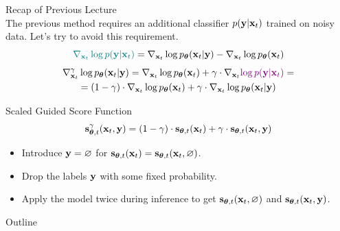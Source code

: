 \documentclass{beamer}
\begin{document}
\begin{frame}{Recap of Previous Lecture}
	\\ The previous method requires an additional classifier $p(\mathbf{y} | \mathbf{x}_t)$ trained on noisy data. Let's try to avoid this requirement.
	\[
		{\color{teal}\nabla_{\mathbf{x}_t} \log p(\mathbf{y} | \mathbf{x}_t)} =  \nabla_{\mathbf{x}_t} \log p_{\boldsymbol{\theta}}(\mathbf{x}_t| \mathbf{y}) -\nabla_{\mathbf{x}_t} \log  p_{\boldsymbol{\theta}}(\mathbf{x}_t)
	\]
	\vspace{-0.7cm}
	\begin{multline*}
		\nabla_{\mathbf{x}_t}^{\gamma} \log p_{\boldsymbol{\theta}}(\mathbf{x}_t | \mathbf{y}) = \nabla_{\mathbf{x}_t} \log p_{\boldsymbol{\theta}}(\mathbf{x}_t) + \gamma \cdot \nabla_{\mathbf{x}_t} {\color{violet}\log p(\mathbf{y} | \mathbf{x}_t)} = \\
		=  (1 - \gamma) \cdot  \nabla_{\mathbf{x}_t} \log p_{\boldsymbol{\theta}}(\mathbf{x}_t) + \gamma \cdot  \nabla_{\mathbf{x}_t} \log p_{\boldsymbol{\theta}}(\mathbf{x}_t| \mathbf{y})
	\end{multline*}
	\vspace{-0.5cm}
	\begin{block}{Scaled Guided Score Function}
		\vspace{-0.3cm}
		\[
			\mathbf{s}^{\gamma}_{\boldsymbol{\theta}, t}(\mathbf{x}_t, \mathbf{y}) = (1 - \gamma) \cdot \mathbf{s}_{\boldsymbol{\theta}, t}(\mathbf{x}_t) +  \gamma \cdot \mathbf{s}_{\boldsymbol{\theta}, t}(\mathbf{x}_t, \mathbf{y})
		\]
		\vspace{-0.5cm}
	\end{block}
	\begin{itemize}
		\item Introduce $\mathbf{y} = \varnothing$  for $\mathbf{s}_{\boldsymbol{\theta}, t}(\mathbf{x}_t) = \mathbf{s}_{\boldsymbol{\theta}, t}(\mathbf{x}_t, \varnothing)$.		
		\item Drop the labels $\mathbf{y}$ with some fixed probability.
		\item Apply the model twice during inference to get $\mathbf{s}_{\boldsymbol{\theta}, t}(\mathbf{x}_t, \varnothing)$ and $\mathbf{s}_{\boldsymbol{\theta}, t}(\mathbf{x}_t, \mathbf{y})$.
	\end{itemize}
\end{frame}
\begin{frame}{Outline}
	\tableofcontents
\end{frame}
\end{document}
